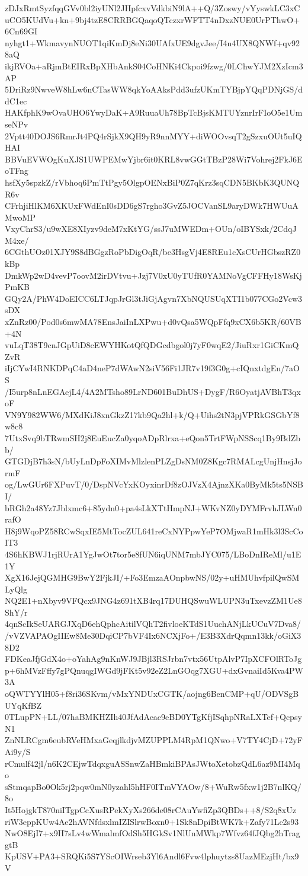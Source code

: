 zDJxRmtSyzfqqGVv0bl2iyUNl2JHpfcxvVdkbiN9lA++Q/3Zoswy/vYyswkLC3xC
uCO5KUdVu+kn+9bj4tzE8CRRBGQaqoQTczxrWFTT4nDxzNUE0UrPThwO+6Cn69GI
nyhgt1+WkmavynNUOT1qiKmDj8eNi30UAfxUE9dgvJee/I4n4UX8QNWf+qv928aQ
ikjRVOa+aRjmBtEIRxBpXHbAnkS04CoHNKi4Ckpoi9fzwg/0LChwYJM2XzIcm3AP
5DriRz9NwveW8hLw6nCTasWW8qkYoAAksPdd3ufzUKmTYBjpYQqPDNjGS/ddC1ec
HAKfphK9wOvaUHO6YwyDaK+A9RuuaUh78BpTcBjsKMTUYznrIrFIoO5e1UmseNPv
2Vptt40DOJS6RmrJt4PQ4rSjkX9QH9yR9nnMYY+diWOOvsqT2gSzxuOUt5uIQHAI
BBVuEVWOgKuXJS1UWPEMwYjbr6it0KRL8vwGGtTBzP28Wi7Vohrej2FkJ6EoTFng
hsfXy5spzkZ/rVbhoq6PmTtPgy5OlgpOENxBiP0Z7qKrz3sqCDN5BKbK3QUNQR6v
CFrhjiHlKM6XKUxFWdEnI0sDD6gS7rgho3GvZ5JOCVanSL9aryDWk7HWUuAMwoMP
VxyChrS3/u9wXE8XIyzv9deM7xKtYG/ssJ7uMWEDm+OUn/oIBYSxk/2CdqJM4xe/
6CGthUOz01XJY9S8dBGgzRoPbDigOqR/be3HsgVj4E8REu1cXsCUrHGbszRZ0kBp
DmkWp2wD4vevP7oovM2irDVtvu+Jzj7V0xU0yTUfR0YAMNoVgCFFHy18WsKjPmKB
GQy2A/PhW4DoEICC6LTJqpJrGl3tJiGjAgvn7XbNQUSUqXTI1b077CGo2Vcw3sDX
xZnRz00/Pod0s6mwMA78EnsJaiInLXPwu+d0vQsa5WQpFfq9xCX6b5KR/60VB+4N
vuLqT38T9cnJGpUiD8cEWYHKotQfQDGcdbgol0j7yF0wqE2/JiuRxr1GiCKmQZvR
iIjCYwI4RNKDPqC4aD4neP7dWAwN2siV56Fi1JR7v19f3G0g+cIQnxtdgEn/7aOS
/I5urp8nLnEGAejL4/4A2MTsho89LrND601BuDhUS+DygF/R6OyatjAVBhT3qxoF
VN9Y982WW6/MXdKiJ8xnGkzZ17kb9Qa2hl+k/Q+Uihs2tN3pjVPRkGSGbYf8w8c8
7UtxSvq9bTRwmSH2j8EuEucZa0yqoADpRlrxa+eQon5TrtFWpNSScq1By9BdZbb/
GTGDjB7h3sN/bUyLnDpFoXIMvMlzlenPLZgDsNM0Z8Kgc7RMALcgUnjHnsjJormF
og/LwGUr6FXPuvT/0/DspNVcYxKOyxinrDf8zOJVzX4AjnzXKa0ByMk5ts5NSBI/
bRGh2a48Yz7Jblxmc6+85ydn0+pa4sLkXTtHmpNJ+WKvNZ0yDYMFrvhJLWn0rafO
H8j9WqoPZ58RCwSqxIE5MtTocZUL641reCxNYPpwYeP7OMjwaR1mHk3l3ScCoIT3
4S6hKBWJ1rjRUrA1YgJwOt7tor5e8fUN6iqUNM7mbJYC075/LBoDnIReMl/u1E1Y
XgX16JejQGMHG9BwY2FjkJI/+Fo3EmzaAOnpbwNS/02y+uHMUhvfpilQwSMLyQlg
NQ2E1+nXbyv9VFQcx9JNG4z691tXB4rq17DUHQSwuWLUPN3uTxevzZM1Ue8ShY/r
4qnScIkSeUARGJXqD6ehQphcAitilVQhT2fivloeKTdS1UuchANjLkUCuV7Dva8/
/vVZVAPAOgIIEw8Me30DqiCP7bVF4Ix6NCXjFo+/E3B3XdrQqmn13kk/oGiX38D2
FDKeaJfjGdX4o+oYahAg9nKnWJ9JBjl3RSJrbn7vtx56UtpAlvP7IpXCFOlRToJg
p+6hMVzFffy7gPQnuqgIWGd9jFKt5v92eZ2LnGOqg7XGU+dxGvnaiId5Kva4PW3A
oQWTYYlH05+f8ri36SKvm/vMxYNDUxCGTK/aojng6BenCMP+qU/ODVSgBUYqKfBZ
0TLupPN+LL/07haBMKHZIh40JfAdAeac9eBD0YTgKfjISqhpNRaLXTef+QcpsyN1
ZnNLRCgm6eubRVeHMxaGeqjlkdjvMZUPPLM4RpM1QNwo+V7TY4CjD+72yFAi9y/S
rCmulf42jl/n6K2CEjwTdqxguASSnwZaHBmkiBPAsJWtoXetobzQdL6az9MI4Mqo
sStmqapBo0Ok5rj2pqw0mN0yzahl5hHF0ITmVYAOw/8+WuRw5fxw1j2B7nlKQ/8o
It5HojgkT870niITgpCcXusRPekXyXs266de08rCAuYwfiZp3QBDs++8/S2q8xUz
riW3eppKUw4Ae2hAVNfdsxlmIZISlrwBoxn0+1Sk8nDpiBtWK7k+Zafy71Lc2s93
NwO8EjI7+x9H7sLv4wWmalmfOdSh5HGkSv1NlUnMWkp7Wfvz64fJQbg2hTraggtB
KpUSV+PA3+SRQKi5S7YScOIWrseb3Yl6Andl6Fvw4lphuytzs8UazMEzjHt/bx9V
